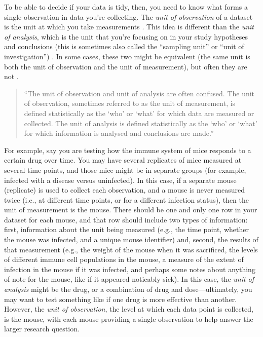 \documentclass[]{tufte-book}
\begin{document}
To be able to decide if your data is tidy, then, you need to know what forms a
single observation in data you're collecting. The \emph{unit of observation} of a
dataset is the unit at which you take measurements \citep{sedgwick2014unit}. This
idea is different than the \emph{unit of analysis}, which is the unit that you're
focusing on in your study hypotheses and conclusions (this is sometimes also
called the ``sampling unit'' or ``unit of investigation'') \citep{altman1997units}. In
some cases, these two might be equivalent (the same unit is both the unit of
observation and the unit of measurement), but often they are not \citep{sedgwick2014unit}.

\begin{quote}
``The unit of observation and unit of analysis are often confused.
The unit of observation, sometimes referred to as the unit of
measurement, is defined statistically as the `who' or `what'
for which data are measured or collected. The unit of analysis
is defined statistically as the `who' or `what' for which
information is analysed and conclusions are made.'' \citep{sedgwick2014unit}
\end{quote}

For example, say you are testing how the immune system of mice responds to a
certain drug over time. You may have several replicates of mice measured at
several time points, and those mice might be in separate groups (for example,
infected with a disease versus uninfected). In this case, if a separate mouse
(replicate) is used to collect each observation, and a mouse is never measured
twice (i.e., at different time points, or for a different infection status),
then the unit of measurement is the mouse. There should be one and only one row
in your dataset for each mouse, and that row should include two types of
information: first, information about the unit being measured (e.g., the time
point, whether the mouse was infected, and a unique mouse identifier) and,
second, the results of that measurement (e.g., the weight of the mouse when it
was sacrificed, the levels of different immune cell populations in the mouse, a
measure of the extent of infection in the mouse if it was infected, and perhaps
some notes about anything of note for the mouse, like if it appeared noticably
sick). In this case, the \emph{unit of analysis} might be the drug, or a combination
of drug and dose---ultimately, you may want to test something like if one
drug is more effective than another. However, the \emph{unit of observation}, the
level at which each data point is collected, is the mouse, with each mouse
providing a single observation to help answer the larger research question.
\end{document}
